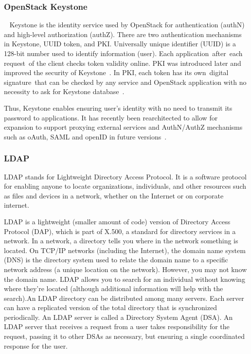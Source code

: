 \subsubsection{OpenStack Keystone \cv}
~\cite{www-keystone-wiki} Keystone is the identity service used by
OpenStack for authentication (authN) and high-level authorization
(authZ).  There are two authentication mechanisms in Keystone, UUID
token, and PKI.  Universally unique identifier (UUID) is a 128-bit
number used to identify information (user). Each
application after each request of the client checks token validity
online. PKI was introduced later and improved the security of
Keystone~\cite{cui2015security}. In PKI, each token has its
own digital signature that can be checked by any service and OpenStack
application with no necessity to ask for Keystone
database~\cite{www-cloudberrylab-kstn}.
 
Thus, Keystone enables ensuring user’s identity with no need to
transmit its password to applications. It has recently been
rearchitected to allow for expansion to support proxying external
services and AuthN/AuthZ mechanisms such as oAuth, SAML and openID in
future versions~\cite{www-keystone}.

\subsubsection{LDAP}

LDAP stands for Lightweight Directory Access Protocol. It is a
software protocol for enabling anyone to locate organizations,
individuals, and other resources such as files and devices in a
network, whether on the Internet or on corporate
internet.~\cite{www-ldap}

     LDAP is a lightweight (smaller amount of code) version of
     Directory Access Protocol (DAP), which is part of X.500, a
     standard for directory services in a network.  In a network, a
     directory tells you where in the network something is located. On
     TCP/IP networks (including the Internet), the domain name system
     (DNS) is the directory system used to relate the domain name to a
     specific network address (a unique location on the
     network). However, you may not know the domain name. LDAP allows
     you to search for an individual without knowing where they're
     located (although additional information will help with the
     search).An LDAP directory can be distributed among many
     servers. Each server can have a replicated version of the total
     directory that is synchronized periodically.  An LDAP server is
     called a Directory System Agent (DSA). An LDAP server that
     receives a request from a user takes responsibility for the
     request, passing it to other DSAs as necessary, but ensuring a
     single coordinated response for the user.

